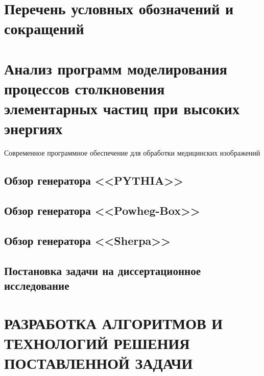 \documentclass[12pt,a4paper]{styles/report}
\begin{document}
	
\renewcommand\contentsname{СОДЕРЖАНИЕ}
\renewcommand{\bibname}{БИБЛИОГРАФИЧЕСКИЙ СПИСОК}
\renewcommand\chaptername{ГЛАВА}
\renewcommand\figurename{Рисунок}
\renewcommand\tablename{Таблица}



\newpage
\pagestyle{plain}  \setcounter{page}{2}
\large \tableofcontents

\newpage
\chapter*{Перечень условных обозначений и сокращений}






\chapter{Анализ программ моделирования процессов столкновения элементарных частиц при высоких энергиях}


Современное программное обеспечение для обработки медицинских изображений

\section{Обзор генератора <<PYTHIA>>}

\section{Обзор генератора <<Powheg-Box>>}

\section{Обзор генератора <<Sherpa>>}


\section{Постановка задачи на диссертационное исследование}

\chapter{РАЗРАБОТКА АЛГОРИТМОВ И ТЕХНОЛОГИЙ РЕШЕНИЯ ПОСТАВЛЕННОЙ ЗАДАЧИ}
\end{document}
